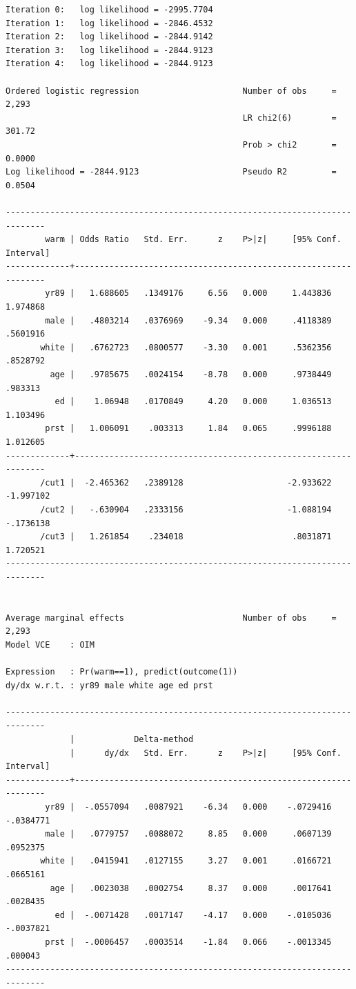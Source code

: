 \documentclass[
]{book}
\begin{document}
\begin{verbatim}
Iteration 0:   log likelihood = -2995.7704  
Iteration 1:   log likelihood = -2846.4532  
Iteration 2:   log likelihood = -2844.9142  
Iteration 3:   log likelihood = -2844.9123  
Iteration 4:   log likelihood = -2844.9123  

Ordered logistic regression                     Number of obs     =      2,293
                                                LR chi2(6)        =     301.72
                                                Prob > chi2       =     0.0000
Log likelihood = -2844.9123                     Pseudo R2         =     0.0504

------------------------------------------------------------------------------
        warm | Odds Ratio   Std. Err.      z    P>|z|     [95% Conf. Interval]
-------------+----------------------------------------------------------------
        yr89 |   1.688605   .1349176     6.56   0.000     1.443836    1.974868
        male |   .4803214   .0376969    -9.34   0.000     .4118389    .5601916
       white |   .6762723   .0800577    -3.30   0.001     .5362356    .8528792
         age |   .9785675   .0024154    -8.78   0.000     .9738449     .983313
          ed |    1.06948   .0170849     4.20   0.000     1.036513    1.103496
        prst |   1.006091    .003313     1.84   0.065     .9996188    1.012605
-------------+----------------------------------------------------------------
       /cut1 |  -2.465362   .2389128                     -2.933622   -1.997102
       /cut2 |   -.630904   .2333156                     -1.088194   -.1736138
       /cut3 |   1.261854    .234018                      .8031871    1.720521
------------------------------------------------------------------------------


Average marginal effects                        Number of obs     =      2,293
Model VCE    : OIM

Expression   : Pr(warm==1), predict(outcome(1))
dy/dx w.r.t. : yr89 male white age ed prst

------------------------------------------------------------------------------
             |            Delta-method
             |      dy/dx   Std. Err.      z    P>|z|     [95% Conf. Interval]
-------------+----------------------------------------------------------------
        yr89 |  -.0557094   .0087921    -6.34   0.000    -.0729416   -.0384771
        male |   .0779757   .0088072     8.85   0.000     .0607139    .0952375
       white |   .0415941   .0127155     3.27   0.001     .0166721    .0665161
         age |   .0023038   .0002754     8.37   0.000     .0017641    .0028435
          ed |  -.0071428   .0017147    -4.17   0.000    -.0105036   -.0037821
        prst |  -.0006457   .0003514    -1.84   0.066    -.0013345     .000043
------------------------------------------------------------------------------



\end{verbatim}
\end{document}
